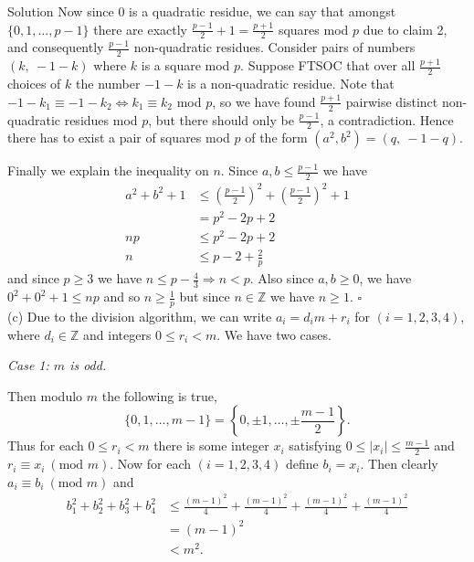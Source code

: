 \documentclass{article}
\begin{document}
\begin{solution}{Solution}
Now since 0 is a quadratic residue, we can say that amongst
$\{0,1,\ldots,p-1\}$ there are exactly $\frac{p-1}{2} + 1 = \frac{p+1}{2}$
squares mod $p$ due to claim 2, and consequently
$\frac{p-1}{2}$ non-quadratic residues. Consider pairs of numbers
$(k, \ -1-k)$ where $k$ is a square mod $p$. Suppose FTSOC that
over all $\frac{p+1}{2}$ choices of $k$ the number $-1-k$ is a non-quadratic
residue. Note that $-1 - k_1 \equiv -1 - k_2 \iff k_1 \equiv k_2$ mod $p$,
so we have found $\frac{p+1}{2}$ pairwise distinct non-quadratic residues
mod $p$, but there should only be $\frac{p-1}{2}$, a contradiction.
Hence there has to exist a
pair of squares mod $p$ of the form $(a^2, b^2) = (q, \ -1-q)$.\\

{\color{gray} \hline}
\vspace{0.2cm}

Finally we explain the inequality on $n$.
Since $a, b \leq \frac{p-1}{2}$ we have
\[
\begin{aligned}
a^2 + b^2 + 1 &\leq \left( \frac{p-1}{2} \right)^2 +
                   \left( \frac{p-1}{2} \right)^2 +
                   1 \\
&= p^2 - 2p + 2 \\
np &\leq p^2 - 2p + 2 \\
n &\leq p - 2 + \frac{2}{p}
\end{aligned}
\]
and since $p \geq 3$ we have $n \leq p - \frac43 \Rightarrow n < p$.
Also since $a,b \geq 0$, we have $0^2 + 0^2 + 1 \leq np$ and so
$n \geq \frac{1}{p}$ but since $n \in \mathbb{Z}$ we have $n \geq 1$.
$\square$ \\

(c) Due to the division algorithm, we can write
$a_i = d_i m + r_i$ for $(i=1,2,3,4)$, where $d_i \in \mathbb{Z}$ and
integers $0 \leq r_i < m$. We have two cases.
\vspace{.2cm}


{\color{gray} \hline}
\vspace{0.2cm}

\textit{Case 1: $m$ is odd.} \vspace{0.2cm}

Then modulo $m$ the following is true,
$$
\{0,1,\ldots,m-1 \} = \left\{0,\pm 1, \ldots, \pm \frac{m-1}{2} \right\}.
$$
Thus for each $0 \leq r_i < m$ there is some integer $x_i$ satisfying
$0 \leq |x_i| \leq \frac{m-1}{2}$ and $r_i \equiv x_i \ (\text{mod } m)$.
Now for each $(i=1,2,3,4)$ define $b_i = x_i$. Then clearly
$a_i \equiv b_i \ (\text{mod } m)$ and
\[
\begin{aligned}
b_1^2 + b_2^2 + b_3^2 + b_4^2 &\leq \frac{(m-1)^2}{4} +
\frac{(m-1)^2}{4} + \frac{(m-1)^2}{4} + \frac{(m-1)^2}{4} \\
&= (m-1)^2 \\
&< m^2.
\end{aligned}
\]



\end{solution}
\end{document}

